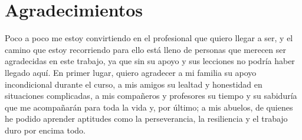 \chapter{Agradecimientos}
Poco a poco me estoy convirtiendo en el profesional que quiero llegar a ser, y el camino que estoy recorriendo para ello está lleno de personas que merecen ser agradecidas en este trabajo, ya que sin su apoyo y sus lecciones no podría haber llegado aquí. En primer lugar, quiero agradecer a mi familia su apoyo incondicional durante el curso, a mis amigos su lealtad y honestidad en situaciones complicadas, a mis compañeros y profesores su tiempo y su sabiduría que me acompañarán para toda la vida y, por último; a mis abuelos, de quienes he podido aprender aptitudes como la perseverancia, la resiliencia y el trabajo duro por encima todo.

\newpage
\thispagestyle{empty}
\hspace*{0.5cm}
\newpage